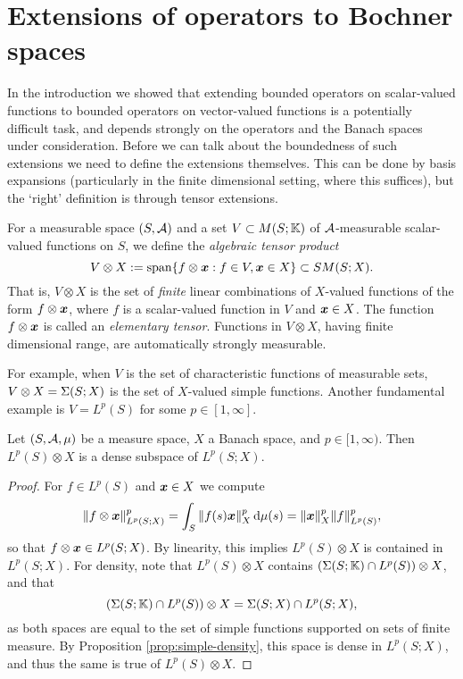 \section{Extensions of operators to Bochner spaces}

In the introduction we showed that extending bounded operators on scalar-valued functions to bounded operators on vector-valued functions is a potentially difficult task, and depends strongly on the operators and the Banach spaces under consideration.
Before we can talk about the boundedness of such extensions we need to define the extensions themselves.
This can be done by basis expansions (particularly in the finite dimensional setting, where this suffices), but the `right' definition is through tensor extensions.

\begin{defn}
  For a measurable space $(S,\mathcal{A})$ and a set $V \subset M(S;\mathbb{K})$ of $\mathcal{A}$-measurable scalar-valued functions on $S$, we define the \emph{algebraic tensor product}
  \begin{equation*}
    V \otimes X := \mathrm{span}\{f \otimes \bm{x} : f \in V, \bm{x} \in X\} \subset SM(S;X).
  \end{equation*}
  That is, $V \otimes X$ is the set of \emph{finite} linear combinations of $X$-valued functions of the form $f \otimes \bm{x}$, where $f$ is a scalar-valued function in $V$ and $\bm{x} \in X$.
  The function $f \otimes \bm{x}$ is called an \emph{elementary tensor}.
  Functions in $V \otimes X$, having finite dimensional range, are automatically strongly measurable.
\end{defn}

For example, when $V$ is the set of characteristic functions of measurable sets, $V \otimes X = \Sigma(S;X)$ is the set of $X$-valued simple functions.
Another fundamental example is $V = L^p(S)$ for some $p \in [1,\infty]$.

\begin{prop}\label{prop:ATP-density}
  Let $(S,\mathcal{A},\mu)$ be a measure space, $X$ a Banach space, and $p \in [1,\infty)$.
  Then $L^p(S) \otimes X$ is a dense subspace of $L^p(S;X)$.
\end{prop}

\begin{proof}
  For $f \in L^p(S)$ and $\bm{x} \in X$ we compute
  \begin{equation*}
    \|f \otimes \bm{x}\|_{L^p(S;X)}^p = \int_S \|f(s)\bm{x}\|_{X}^p \, \mathrm{d}\mu(s) = \|\bm{x}\|_X^p \|f\|_{L^p(S)}^p,
  \end{equation*}
  so that $f \otimes \bm{x} \in L^p(S;X)$.
  By linearity, this implies $L^p(S) \otimes X$ is contained in $L^p(S;X)$.
  For density, note that $L^p(S) \otimes X$ contains $(\Sigma(S;\mathbb{K}) \cap L^p(S)) \otimes X$, and that
  \begin{equation*}
    (\Sigma(S;\mathbb{K}) \cap L^p(S)) \otimes X = \Sigma(S;X) \cap L^p(S;X),
  \end{equation*}
  as both spaces are equal to the set of simple functions supported on sets of finite measure.
  By Proposition \ref{prop:simple-density}, this space is dense in $L^p(S;X)$, and thus the same is true of $L^p(S) \otimes X$.
\end{proof}

